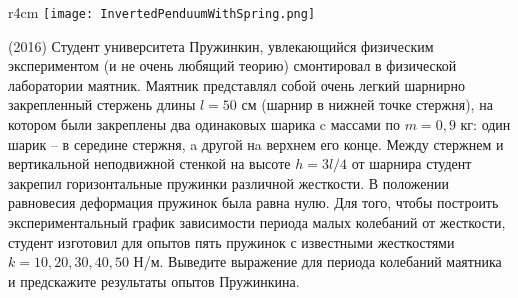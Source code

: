 \begin{wrapfigure}{r}{4cm}
\texttt{[image: InvertedPenduumWithSpring.png]}
\end{wrapfigure}
\AddProb (2016) Студент университета Пружинкин, увлекающийся физическим экспериментом (и не очень любящий теорию) смонтировал в физической лаборатории маятник. Маятник представлял собой очень легкий шарнирно закрепленный стержень длины $l = 50$ см (шарнир в нижней точке стержня), на котором были закреплены два одинаковых шарика c массами по $m = 0,9$ кг: один шарик -- в середине стержня, a другой нa верхнем его конце. Между стержнем и вертикальной неподвижной стенкой на высоте $h=3l/4$ от шарнира студент закрепил горизонтальные пружинки различной жесткости. В положении равновесия деформация пружинок была равна нулю. Для того, чтобы построить экспериментальный график зависимости периода малых колебаний от жесткости, студент изготовил для опытов пять пружинок с известными жесткостями $k = 10, 20, 30, 40, 50$ Н/м. Выведите выражение для периода колебаний маятника и предскажите результаты опытов Пружинкина.